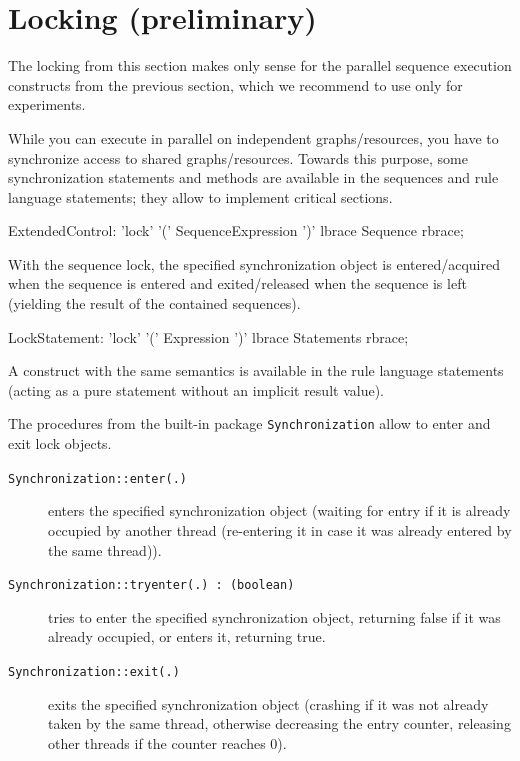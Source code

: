 
\section{Locking (preliminary)}\label{locking}

\begin{warning}
The locking from this section makes only sense for the parallel sequence execution constructs from the previous section, which we recommend to use only for experiments.
\end{warning}

While you can execute in parallel on independent graphs/resources, you have to synchronize access to shared graphs/resources.
Towards this purpose, some synchronization statements and methods are available in the sequences and rule language statements; they allow to implement critical sections.

\begin{rail}
  ExtendedControl: 'lock' '(' SequenceExpression ')' lbrace Sequence rbrace;
\end{rail}

With the sequence lock, the specified synchronization object is entered/acquired when the sequence is entered and exited/released when the sequence is left (yielding the result of the contained sequences).

\begin{rail}
  LockStatement: 'lock' '(' Expression ')' lbrace Statements rbrace;
\end{rail}

A construct with the same semantics is available in the rule language statements (acting as a pure statement without an implicit result value).

The procedures from the built-in package \texttt{Synchronization} allow to enter and exit lock objects.

\begin{description}
\item[\texttt{Synchronization::enter(.)}] enters the specified synchronization object (waiting for entry if it is already occupied by another thread (re-entering it in case it was already entered by the same thread)).
\item[\texttt{Synchronization::tryenter(.) : (boolean)}] tries to enter the specified synchronization object, returning false if it was already occupied, or enters it, returning true.
\item[\texttt{Synchronization::exit(.)}] exits the specified synchronization object (crashing if it was not already taken by the same thread, otherwise decreasing the entry counter, releasing other threads if the counter reaches 0).
\end{description}
   
